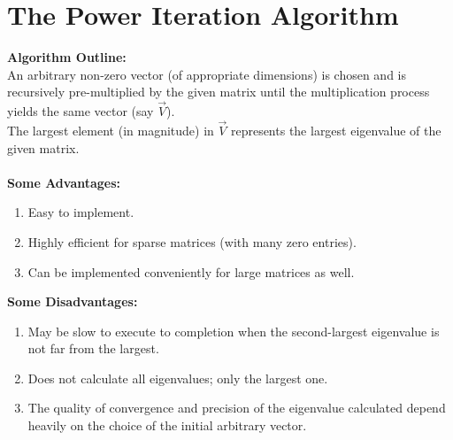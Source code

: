 \documentclass[journal,12pt,twocolumn]{IEEEtran}
\theoremstyle{remark}
\begin{document}
\section{The Power Iteration Algorithm}
\textbf{Algorithm Outline:}
\\
An arbitrary non-zero vector (of appropriate dimensions) is chosen and is recursively pre-multiplied by the given matrix until the multiplication process yields the same vector (say $\vec{V}$). \\
The largest element (in magnitude) in $\vec{V}$ represents the largest eigenvalue of the given matrix. \\ 
\\
\textbf{Some Advantages:}
\begin{enumerate}
\item Easy to implement.
\item Highly efficient for sparse matrices (with many zero entries).
\item Can be implemented conveniently for large matrices as well.
\end{enumerate}
\textbf{Some Disadvantages:}
\begin{enumerate}
\item May be slow to execute to completion when the second-largest eigenvalue is not far from the largest.
\item Does not calculate all eigenvalues; only the largest one.
\item The quality of convergence and precision of the eigenvalue calculated depend heavily on the choice of the initial arbitrary vector.
\end{enumerate}
\end{document}
